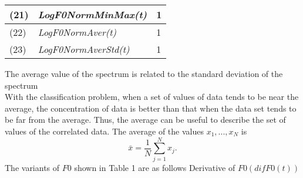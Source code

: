 \documentclass[a4paper,12pt]{article}
\begin{document}
\begin{table}[h]
{\begin{tabular}{|l|l|l|}
(21)           & \textit{LogF0NormMinMax(t)}                                              & 1                                                                        \\ \hline
(22)           & \textit{LogF0NormAver(t)}                                                & 1                                                                        \\ \hline
(23)           & \textit{LogF0NormAverStd(t)}                                             & 1                                                                        \\ \hline
\end{tabular}
}
\end{table}
The average value of the spectrum is related to the standard deviation of the spectrum 
\\
With the classification problem, when a set of values of data tends to be near the average,
the concentration of data is better than that when the data set tends to be far from the
average. Thus, the average can be useful to describe the set of values of the correlated data.
The average of the values $x_1, ..., x_N$ is
\begin{equation}
\bar{x}=\frac{1}{N} \sum_{j=1}^N x_j .
\end{equation}
The variants of $F0$ shown in Table 1 are as follows
Derivative of $F0 (difF0 (t))$
\\
\end{document}
